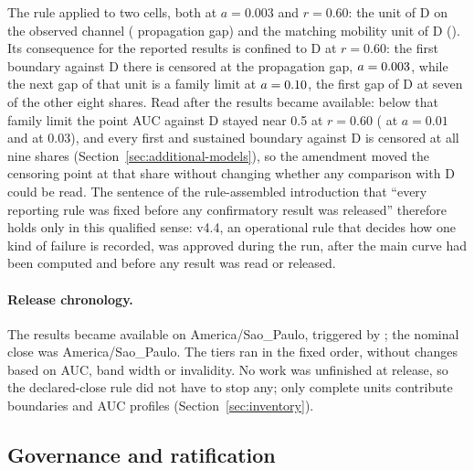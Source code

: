 The rule applied to two cells, both at $a=0.003$ and $r=0.60$: the unit of D on the observed channel ( propagation gap) and the matching mobility unit of D (). Its consequence for the reported results is confined to D at $r=0.60$: the first boundary against D there is censored at the propagation gap, $a=\resultnum{v4.tab.T1.D.r060.a_star.1}{0.003}$, while the next gap of that unit is a family limit at $a=\resultnum{j.models.D.r060.first.gap.1.a}{0.10}$, the first gap of D at seven of the other eight shares. Read after the results became available: below that family limit the point AUC against D stayed near 0.5 at $r=0.60$ ( at $a=0.01$ and  at 0.03), and every first and sustained boundary against D is censored at all nine shares (Section~\ref{sec:additional-models}), so the amendment moved the censoring point at that share without changing whether any comparison with D could be read. The sentence of the rule-assembled introduction that ``every reporting rule was fixed before any confirmatory result was released'' therefore holds only in this qualified sense: v4.4, an operational rule that decides how one kind of failure is recorded, was approved during the run, after the main curve had been computed and before any result was read or released.

\paragraph{Release chronology.}
The results became available on  America/Sao\_Paulo, triggered by ; the nominal close was  America/Sao\_Paulo. The tiers ran in the fixed order, without changes based on AUC, band width or invalidity. No work was unfinished at release, so the declared-close rule did not have to stop any; only complete units contribute boundaries and AUC profiles (Section~\ref{sec:inventory}).

\subsection{Governance and ratification}\label{sec:record-governance}

